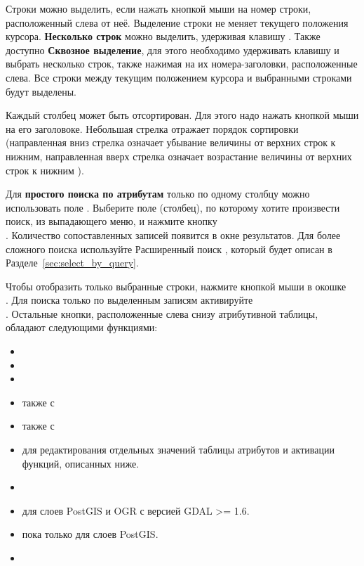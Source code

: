 Строки можно выделить, если нажать кнопкой мыши на номер строки, расположенный
слева от неё. Выделение строки не меняет текущего положения курсора.
\textbf{Несколько строк} можно выделить, удерживая клавишу .
Также доступно \textbf{Сквозное выделение}, для этого необходимо
удерживать клавишу  и выбрать несколько строк, также
нажимая на их номера-заголовки, расположенные слева. Все строки между
текущим положением курсора и выбранными строками будут выделены.

Каждый столбец может быть отсортирован. Для этого надо нажать кнопкой мыши
на его заголовоке. Небольшая стрелка отражает порядок сортировки (направленная
вниз стрелка означает убывание величины от верхних строк к нижним,
направленная вверх стрелка означает возрастание величины от верхних строк
к нижним ).

Для \textbf{простого поиска по атрибутам} только по одному столбцу можно
использовать поле . Выберите поле (столбец), по которому
хотите произвести поиск, из выпадающего меню, и нажмите кнопку \\ .
Количество сопоставленных записей появится в окне результатов. Для более
сложного поиска используйте Расширенный поиск , который будет
описан в Разделе~\ref{sec:select_by_query}.

Чтобы отобразить только выбранные строки, нажмите кнопкой мыши в окошке \\
. Для поиска только по выделенным
записям активируйте \\
. Остальные
кнопки, расположенные слева снизу атрибутивной таблицы, обладают следующими
функциями:

\begin{itemize}[label=--]
\item {}
\item {}
\item {}
\item {}
также с 
\item {}
также с 
\item {} для
редактирования отдельных значений таблицы атрибутов и активации функций,
описанных ниже.
\item {}
\item {} для слоев PostGIS
и OGR с версией GDAL >= 1.6.
\item {} пока только для
слоев PostGIS.
\item {}
\end{itemize}

